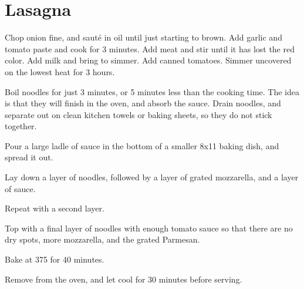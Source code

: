 \section{Lasagna}

\begin{recipe}



Chop onion fine, and sauté in oil until just starting to brown. Add garlic and tomato paste and cook for 3 minutes.
Add meat and stir until it has lost the red color. Add milk and bring to simmer. Add canned tomatoes.
Simmer uncovered on the lowest heat for 3 hours.


Boil noodles for just 3 minutes, or 5 minutes less than the cooking time. The idea is that they will finish in the oven,
and absorb the sauce. Drain noodles, and separate out on clean kitchen towels or baking sheets, so they do not stick together.

Pour a large ladle of sauce in the bottom of a smaller 8x11 baking dish, and spread it out.

Lay down a layer of noodles, followed by a layer of grated mozzarella, and a layer of sauce.

Repeat with a second layer.


Top with a final layer of noodles with enough tomato sauce so that there are no dry spots, more mozzarella, and the grated Parmesan.

Bake at 375\degree{} for 40 minutes.

Remove from the oven, and let cool for 30 minutes before serving.

\end{recipe}
